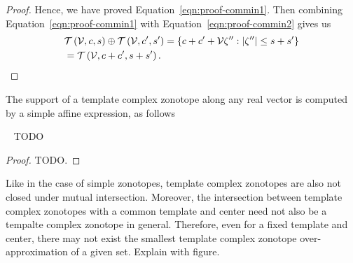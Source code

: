 \begin{proof}
Hence, we have proved Equation~\ref{eqn:proof-commin1}.  Then combining 
Equation~\ref{eqn:proof-commin1}  with
Equation~\ref{eqn:proof-commin2} gives us
%
\begin{align*}
&\mathit{\operatorname{\mathcal{T}}}\left(\mathcal{V},c,s\right)\oplus \mathit{\operatorname{\mathcal{T}}}\left(\mathcal{V},c^\prime,s^\prime\right)=\left\{c+c^\prime+\mathcal{V}\zeta^{\prime\prime}:\left|\zeta^{\prime\prime}\right|\leq s+s^\prime\right\}\\
&=\mathit{\operatorname{\mathcal{T}}}\left(\mathcal{V},c+c^\prime,s+s^\prime\right).
\end{align*}
%
\end{proof}
%
The support of a template complex zonotope along any real vector is computed by a simple affine expression, as follows
%
\begin{lemma}~\label{lem:support-tcz}
{\color{red} TODO}
\end{lemma}
%
\begin{proof}
{\color{red}TODO}.
\end{proof}
%
Like in the case of simple
zonotopes, template complex zonotopes are also not closed under mutual
intersection.  Moreover, the intersection between template complex
zonotopes with a common template and center need not also be a
tempalte complex zonotope in general.  Therefore, even for a fixed
template and center, there may not exist the smallest template complex
zonotope over-approximation of a given set. {\color{red} Explain with
figure}.

